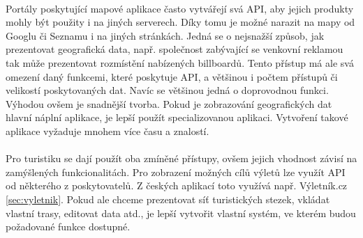 \documentclass[11pt,a4paper,titlepage,oneside]{book}
\begin{document}




	\paragraph{} Portály poskytující mapové aplikace často vytvářejí svá API, aby jejich produkty mohly být použity i na jiných serverech. Díky tomu je možné narazit na mapy od Googlu či Seznamu i na jiných stránkách. Jedná se o nejsnažší způsob, jak prezentovat geografická data, např. společnost zabývající se venkovní reklamou tak může prezentovat rozmístění nabízených billboardů. Tento přístup má ale svá omezení daný funkcemi, které poskytuje API, a většinou i počtem přístupů či velikostí poskytovaných dat. Navíc se většinou jedná o doprovodnou funkci. Výhodou ovšem je snadnější tvorba. Pokud je zobrazování geografických dat hlavní náplní aplikace, je lepší použít specializovanou aplikaci. Vytvoření takové aplikace vyžaduje mnohem více času a znalostí. 
	\paragraph{} Pro turistiku se dají použít oba zmíněné přístupy, ovšem jejich vhodnost závisí na zamýšlených funkcionalitách. Pro zobrazení možných cílů výletů lze využít API od některého z poskytovatelů. Z českých aplikací toto využívá např. Výletník.cz \ref{sec:vyletnik}. Pokud ale chceme prezentovat síť turistických stezek, vkládat vlastní trasy, editovat data atd., je lepší vytvořit vlastní systém, ve kterém budou požadované funkce dostupné.
\end{document}

